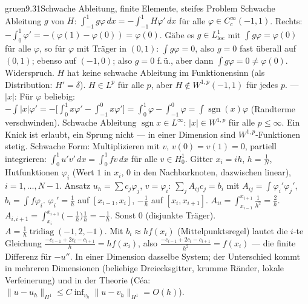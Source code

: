\begin{loesungkarte}{gruen}{9.31}{Schwache Ableitung, finite Elemente, steifes Problem}
Schwache Ableitung $g$ von $H$: $\int_{-1}^{1}g\varphi\,dx = -\int_{-1}^{1}H\varphi'\,dx$ für alle $\varphi\in C_c^{\infty}(-1, 1)$. Rechts: $-\int_0^{1}\varphi' = -(\varphi(1) - \varphi(0)) = \varphi(0)$. Gäbe es $g\in L^{1}_{\text{loc}}$ mit $\int g\varphi = \varphi(0)$ für alle $\varphi$, so für $\varphi$ mit Träger in $(0, 1)$: $\int g\varphi = 0$, also $g = 0$ fast überall auf $(0, 1)$; ebenso auf $(-1, 0)$; also $g = 0$ f.\,ü., aber dann $\int g\varphi = 0\neq\varphi(0)$. Widerspruch. $H$ hat keine schwache Ableitung im Funktionensinn (als Distribution: $H' = \delta$). $H\in L^{p}$ für alle $p$, aber $H\notin W^{1,p}(-1, 1)$ für jedes $p$. --- $|x|$: Für $\varphi$ beliebig: $-\int|x|\varphi' = -\bigl[\int_0^{1}x\varphi' - \int_{-1}^{0}x\varphi'\bigr] = \int_0^{1}\varphi - \int_{-1}^{0}\varphi = \int\operatorname{sgn}(x)\varphi$ (Randterme verschwinden). Schwache Ableitung $\operatorname{sgn}x\in L^{\infty}$: $|x|\in W^{1,p}$ für alle $p\le\infty$. Ein Knick ist erlaubt, ein Sprung nicht --- in einer Dimension sind $W^{1,p}$-Funktionen stetig.
Schwache Form: Multiplizieren mit $v$, $v(0) = v(1) = 0$, partiell integrieren: $\int_0^{1}u'v'\,dx = \int_0^{1}fv\,dx$ für alle $v\in H_0^{1}$. Gitter $x_i = ih$, $h = \frac1N$, Hutfunktionen $\varphi_i$ (Wert $1$ in $x_i$, $0$ in den Nachbarknoten, dazwischen linear), $i = 1, \dots, N - 1$. Ansatz $u_h = \sum c_j\varphi_j$, $v = \varphi_i$: $\sum_jA_{ij}c_j = b_i$ mit $A_{ij} = \int\varphi_i'\varphi_j'$, $b_i = \int f\varphi_i$. $\varphi_i' = \frac1h$ auf $[x_{i-1}, x_i]$, $-\frac1h$ auf $[x_i, x_{i+1}]$. $A_{ii} = \int_{x_{i-1}}^{x_{i+1}}\frac1{h^{2}} = \frac2h$. $A_{i,i+1} = \int_{x_i}^{x_{i+1}}\bigl(-\frac1h\bigr)\frac1h = -\frac1h$. Sonst $0$ (disjunkte Träger). $A = \frac1h\operatorname{tridiag}(-1, 2, -1)$. Mit $b_i\approx hf(x_i)$ (Mittelpunktsregel) lautet die $i$-te Gleichung $\frac{-c_{i-1} + 2c_i - c_{i+1}}h = hf(x_i)$, also $\frac{-c_{i-1} + 2c_i - c_{i+1}}{h^{2}} = f(x_i)$ --- die finite Differenz für $-u''$. In einer Dimension dasselbe System; der Unterschied kommt in mehreren Dimensionen (beliebige Dreiecksgitter, krumme Ränder, lokale Verfeinerung) und in der Theorie (Céa: $\|u - u_h\|_{H^{1}}\le C\inf_{v_h}\|u - v_h\|_{H^{1}} = O(h)$).

\end{loesungkarte}

